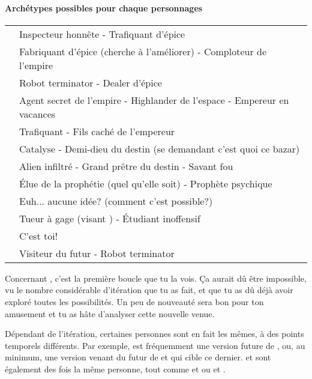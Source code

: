 {	%
	
	
	\paragraph{Archétypes possibles pour chaque personnages}
	\begin{center}
	\begin{tabular}{|l||l|}
		\hline
		\emph{\nmPlayerVII} & Inspecteur honnête - Trafiquant d'épice\\
		\emph{\nmPlayerXII} & Fabriquant d'épice (cherche à l'améliorer) - Comploteur de l'empire\\
		\emph{\nmPlayerVIII} & Robot terminator - Dealer d'épice\\
		\emph{\nmPlayerX} & Agent secret de l'empire - Highlander de l'espace - Empereur en vacances\\
		\emph{\nmPlayerII} & Trafiquant - Fils caché de l'empereur\\
		\emph{\nmPlayerXI} & Catalyse - Demi-dieu du destin (se demandant c'est quoi ce bazar)\\
		\emph{\nmPlayerI} & Alien infiltré - Grand prêtre du destin - Savant fou\\
		\emph{\nmPlayerIX} & Élue de la prophétie (quel qu'elle soit) - Prophète psychique\\
		\emph{\nmPlayerVI} & Euh... aucune idée? (comment c'est possible?)\\
		\emph{\nmPlayerIII} & Tueur à gage (visant \nmPlayerX) - Étudiant inoffensif\\
		\emph{\nmPlayerIV} & C'est toi!\\
		\emph{\nmPlayerV} & Visiteur du futur - Robot terminator\\
		\hline
	\end{tabular}
	\end{center}
	\par Concernant \nmPlayerVI, c'est la première boucle que tu la vois. Ça aurait dû être impossible, vu le nombre considérable d'itération que tu as fait, et que tu as dû déjà avoir exploré toutes les possibilités. Un peu de nouveauté sera bon pour ton amusement et tu as hâte d'analyser cette nouvelle venue.
	
	\par Dépendant de l'itération, certaines personnes sont en fait les mêmes, à des points temporels différents. Par exemple, \nmPlayerV est fréquemment une version future de \nmPlayerVII, ou, au minimum, une version venant du futur de \nmPlayerVII et qui cible ce dernier. \nmPlayerII et \nmPlayerIII sont également des fois la même personne, tout comme \nmPlayerX et \nmPlayerVIII ou \nmPlayerXII et \nmPlayerIII.
	
}
